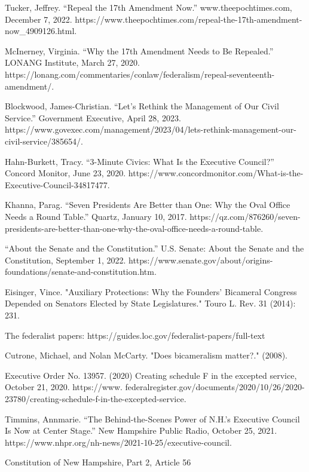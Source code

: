 \documentclass{article}
\begin{document}
\begin{thebibliography}{20}
Tucker, Jeffrey. “Repeal the 17th Amendment Now.” www.theepochtimes.com, December 7, 2022. https://www.theepochtimes.com/repeal-the-17th-amendment-now\_4909126.html. 

McInerney, Virginia. “Why the 17th Amendment Needs to Be Repealed.” LONANG Institute, March 27, 2020. https://lonang.com/commentaries/conlaw/federalism/repeal-seventeenth-amendment/. 

Blockwood, James-Christian. “Let’s Rethink the Management of Our Civil Service.” Government Executive, April 28, 2023. https://www.govexec.com/management/2023/04/lets-rethink-management-our-civil-service/385654/. 

Hahn-Burkett, Tracy. “3-Minute Civics: What Is the Executive Council?” Concord Monitor, June 23, 2020. https://www.concordmonitor.com/What-is-the-Executive-Council-34817477. 

Khanna, Parag. “Seven Presidents Are Better than One: Why the Oval Office Needs a Round Table.” Quartz, January 10, 2017. https://qz.com/876260/seven-presidents-are-better-than-one-why-the-oval-office-needs-a-round-table. 

“About the Senate and the Constitution.” U.S. Senate: About the Senate and the Constitution, September 1, 2022. https://www.senate.gov/about/origins-foundations/senate-and-constitution.htm. 

Eisinger, Vince. "Auxiliary Protections: Why the Founders' Bicameral Congress Depended on Senators Elected by State Legislatures." Touro L. Rev. 31 (2014): 231.

The federalist papers: https://guides.loc.gov/federalist-papers/full-text

Cutrone, Michael, and Nolan McCarty. "Does bicameralism matter?." (2008).

Executive Order No. 13957. (2020) Creating schedule F in the excepted service, October 21, 2020. https://www.
federalregister.gov/documents/2020/10/26/2020-23780/creating-schedule-f-in-the-excepted-service.

Timmins, Annmarie. “The Behind-the-Scenes Power of N.H.’s Executive Council Is Now at Center Stage.” New Hampshire Public Radio, October 25, 2021. https://www.nhpr.org/nh-news/2021-10-25/executive-council. 

Constitution of New Hampshire, Part 2, Article 56


\end{thebibliography}
\end{document}
